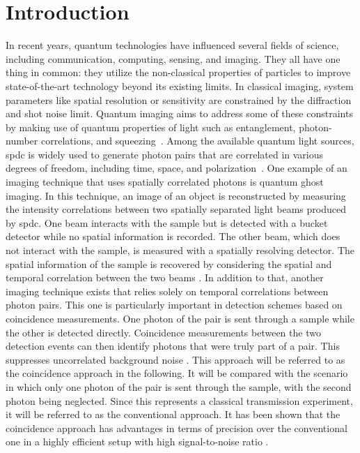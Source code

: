 \section{Introduction}

In recent years, quantum technologies have influenced several fields of science, including communication, computing, sensing, and imaging. They all have one thing in common: they utilize the non-classical properties of particles to improve state-of-the-art technology beyond its existing limits. \newline
In classical imaging, system parameters like spatial resolution or sensitivity are constrained by the diffraction and shot noise limit. 
Quantum imaging aims to address some of these constraints by making use of quantum properties of light such as entanglement, photon-number correlations, and squeezing~\cite{defienneAdvancesQuantumImaging2024,moreauImagingQuantumStates2019}. \newline
Among the available quantum light sources, \acrfull{spdc} is widely used to generate photon pairs that are correlated in various degrees of freedom, including time, space, and polarization~\cite{moreauImagingQuantumStates2019}. \newline
One example of an imaging technique that uses spatially correlated photons is quantum ghost imaging. In this technique, an image of an object is reconstructed by measuring the intensity correlations between two spatially separated light beams produced by \acrshort{spdc}. One beam interacts with the sample but is detected with a bucket detector while no spatial information is recorded. The other beam, which does not interact with the sample, is measured with a spatially resolving detector. The spatial information of the sample is recovered by considering the spatial and temporal correlation between the two beams \cite{gilabertebassetPerspectivesApplicationsQuantum2019,lemosQuantumImagingUndetected2014}. \newline
In addition to that, another imaging technique exists that relies solely on temporal correlations between photon pairs. This one is particularly important in detection schemes based on coincidence measurements. One photon of the pair is sent through a sample while the other is detected directly. Coincidence measurements between the two detection events can then identify photons that were truly part of a pair. This suppresses uncorrelated background noise \cite{moreauImagingQuantumStates2019}. This approach will be referred to as the coincidence approach in the following. It will be compared with the scenario in which only one photon of the pair is sent through the sample, with the second photon being neglected. Since this represents a classical transmission experiment, it will be referred to as the conventional approach. It has been shown that the coincidence approach has advantages in terms of precision over the conventional one in a highly efficient setup with high signal-to-noise ratio \cite{sabines-chesterkingSubShotNoiseTransmissionMeasurement2017,sabines-chesterkingTwinbeamSubshotnoiseRasterscanning2019}. \newline
